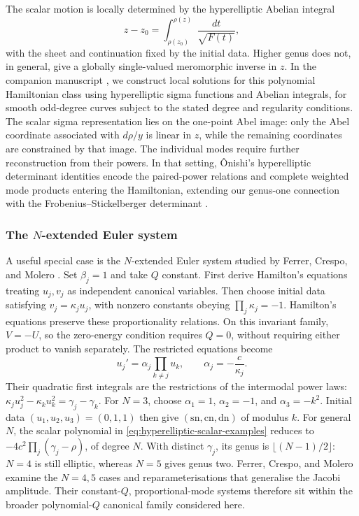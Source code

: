 \documentclass[11pt,a4paper]{article}
\numberwithin{equation}{section}
\begin{document}
The scalar motion is locally determined by the hyperelliptic Abelian integral
\begin{equation}
    z-z_0=\int_{\rho(z_0)}^{\rho(z)}\frac{dt}{\sqrt{F(t)}},
    \label{eq:hyperelliptic-scalar-quadrature-examples}
\end{equation}
with the sheet and continuation fixed by the initial data. Higher genus does not, in general, give a globally single-valued meromorphic inverse in $z$. In the companion manuscript \cite{zotero-item-855}, we construct local solutions for this polynomial Hamiltonian class using hyperelliptic sigma functions and Abelian integrals, for smooth odd-degree curves subject to the stated degree and regularity conditions. The scalar sigma representation lies on the one-point Abel image: only the Abel coordinate associated with $d\rho/y$ is linear in $z$, while the remaining coordinates are constrained by that image. The individual modes require further reconstruction from their powers. In that setting, \^Onishi's hyperelliptic determinant identities \cite{onishiDETERMINANTEXPRESSIONSHYPERELLIPTIC2005} encode the paired-power relations and complete weighted mode products entering the Hamiltonian, extending our genus-one connection with the Frobenius--Stickelberger determinant \cite{heskethFWMWeierstrassElliptic2026,heskethCompleteWeierstrassElliptic2026}.

\subsubsection{The \texorpdfstring{$N$}{N}-extended Euler system}
\label{sec:n-extended-euler-example}

A useful special case is the $N$-extended Euler system studied by Ferrer, Crespo, and Molero \cite{ferrerNExtendedEulerSystem2015}. Set $\beta_j=1$ and take $Q$ constant. First derive Hamilton's equations treating $u_j,v_j$ as independent canonical variables. Then choose initial data satisfying $v_j=\kappa_j u_j$, with nonzero constants obeying $\prod_j\kappa_j=-1$. Hamilton's equations preserve these proportionality relations. On this invariant family, $V=-U$, so the zero-energy condition requires $Q=0$, without requiring either product to vanish separately. The restricted equations become
\begin{equation}
    u_j'=\alpha_j\prod_{k\ne j}u_k,
    \qquad \alpha_j=-\frac{c}{\kappa_j}.
    \label{eq:n-extended-euler-reduction}
\end{equation}
Their quadratic first integrals are the restrictions of the intermodal power laws: $\kappa_j u_j^2-\kappa_k u_k^2=\gamma_j-\gamma_k$. For $N=3$, choose $\alpha_1=1$, $\alpha_2=-1$, and $\alpha_3=-k^2$. Initial data $(u_1,u_2,u_3)=(0,1,1)$ then give $(\mathrm{sn},\mathrm{cn},\mathrm{dn})$ of modulus $k$. For general $N$, the scalar polynomial in \eqref{eq:hyperelliptic-scalar-examples} reduces to $-4c^2\prod_j(\gamma_j-\rho)$, of degree $N$. With distinct $\gamma_j$, its genus is $\lfloor(N-1)/2\rfloor$: $N=4$ is still elliptic, whereas $N=5$ gives genus two. Ferrer, Crespo, and Molero examine the $N=4,5$ cases and reparameterisations that generalise the Jacobi amplitude. Their constant-$Q$, proportional-mode systems therefore sit within the broader polynomial-$Q$ canonical family considered here.
\end{document}
